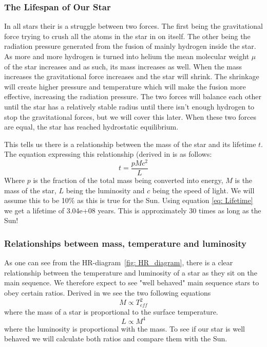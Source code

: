 \documentclass[reprint,english,notitlepage]{revtex4-2}
\begin{document}
\subsubsection*{The Lifespan of Our Star}
In all stars their is a struggle between two forces. The first being the gravitational force trying to crush all the atoms in the star in on itself. The other being the radiation pressure generated from the fusion of mainly hydrogen inside the star. As more and more hydrogen is turned into helium the mean molecular weight $ μ $ of the star increases and as such, its mass increases as well. When the mass increases the gravitational force increases and the star will shrink. The shrinkage will create higher pressure and temperature which will make the fusion more effective, increasing the radiation pressure. The two forces will balance each other until the star has a relatively stable radius until there isn't enough hydrogen to stop the gravitational forces, but we will cover this later. When these two forces are equal, the star has reached hydrostatic equilibrium. 

This tells us there is a relationship between the mass of the star and its lifetime $ t $. The equation expressing this relationship (derived in %
is as follows:
\begin{equation} \label{eq: Lifetime}
  t = \frac{pMc^{2}}{L}
\end{equation}
Where $ p $ is the fraction of the total mass being converted into energy, $ M $ is the mass of the star, $ L $ being the luminosity and $ c $ being the speed of light.
We will assume this to be 10\% as this is true for the Sun. Using equation \ref{eq: Lifetime} we get a lifetime of 3.04e+08 years.
This is approximately 30 times as long as the Sun!

\subsubsection*{Relationships between mass, temperature and luminosity}
As one can see from the HR-diagram~\ref{fig: HR_diagram}, there is a clear relationship between the temperature and luminosity of a star as they sit on the main sequence.
We therefore expect to see "well behaved" main sequence stars to obey certain ratios.
Derived in%
we see the two following equations
\begin{equation}\label{eq: T M ratio}
  M ∝ T^{2}_{eff}
\end{equation}
where the mass of a star is proportional to the surface temperature. 
\begin{equation}\label{eq: M L ratio}
  L ∝ M^{4}
\end{equation}
where the luminosity is proportional with the mass. To see if our star is well behaved we will calculate both ratios and compare them with the Sun. 
\end{document}
